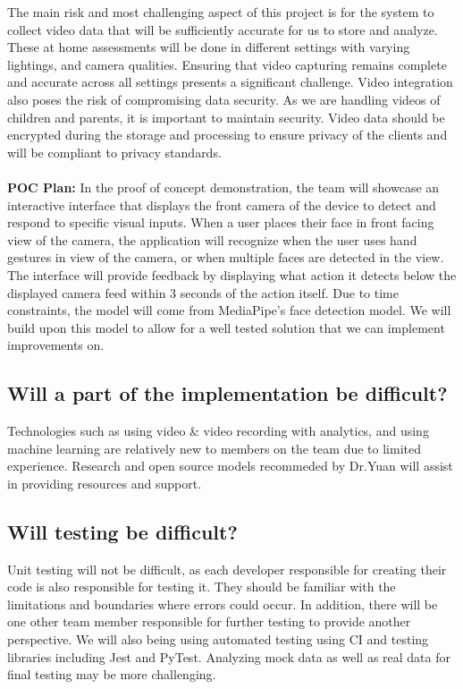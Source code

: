 \documentclass{article}
\begin{document}
 The main risk and most challenging aspect of this project is for the system to collect video data that will be sufficiently accurate for us to store and analyze. 
These at home assessments will be done in different settings with varying lightings, and camera qualities. Ensuring that video capturing remains complete and accurate across all settings presents a significant challenge.  Video integration also poses the risk of compromising data security. As we are handling videos of children and parents, it is important to maintain security. Video data should be encrypted during the storage and processing to ensure privacy of the clients and will be compliant to privacy standards. \\  
\\
\noindent \textbf{POC Plan:} 
In the proof of concept demonstration, the team will showcase an interactive interface that displays the front 
camera of the device to detect and respond to specific visual inputs. When a user places their face in front 
facing view of the camera, the application will recognize when the user uses hand gestures in view of the camera, 
or when multiple faces are detected in the view. The interface will provide feedback by displaying what action it 
detects below the displayed camera feed within 3 seconds of the action itself. Due to time constraints, the model will come from MediaPipe's face detection model. We will build upon this model
to allow for a well tested solution that we can implement improvements on. 

\subsection{Will a part of the implementation be difficult?}
Technologies such as using video \& video recording with analytics, and using machine learning are relatively new to members on the team due to limited experience. Research and open source models recommeded by Dr.Yuan will assist in providing resources and support. \\

\subsection{Will testing be difficult?} 
Unit testing will not be difficult, as each developer responsible for creating their code is also responsible for testing it. They should be familiar with the limitations and boundaries where errors could occur. In addition, there will be one other team member responsible for further testing to provide another perspective. We will also being using automated testing using CI and testing libraries including Jest and PyTest. Analyzing mock data as well as real data for final testing may be more challenging. \\
\end{document}
